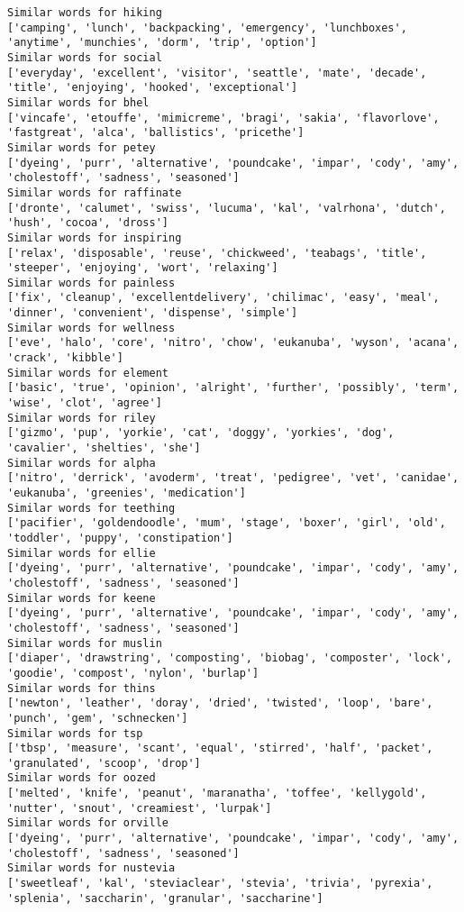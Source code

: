 \documentclass[11pt]{article}
\begin{document}
\begin{Verbatim}[commandchars=\\\{\}]
Similar words for hiking
['camping', 'lunch', 'backpacking', 'emergency', 'lunchboxes', 'anytime', 'munchies', 'dorm', 'trip', 'option']
Similar words for social
['everyday', 'excellent', 'visitor', 'seattle', 'mate', 'decade', 'title', 'enjoying', 'hooked', 'exceptional']
Similar words for bhel
['vincafe', 'etouffe', 'mimicreme', 'bragi', 'sakia', 'flavorlove', 'fastgreat', 'alca', 'ballistics', 'pricethe']
Similar words for petey
['dyeing', 'purr', 'alternative', 'poundcake', 'impar', 'cody', 'amy', 'cholestoff', 'sadness', 'seasoned']
Similar words for raffinate
['dronte', 'calumet', 'swiss', 'lucuma', 'kal', 'valrhona', 'dutch', 'hush', 'cocoa', 'dross']
Similar words for inspiring
['relax', 'disposable', 'reuse', 'chickweed', 'teabags', 'title', 'steeper', 'enjoying', 'wort', 'relaxing']
Similar words for painless
['fix', 'cleanup', 'excellentdelivery', 'chilimac', 'easy', 'meal', 'dinner', 'convenient', 'dispense', 'simple']
Similar words for wellness
['eve', 'halo', 'core', 'nitro', 'chow', 'eukanuba', 'wyson', 'acana', 'crack', 'kibble']
Similar words for element
['basic', 'true', 'opinion', 'alright', 'further', 'possibly', 'term', 'wise', 'clot', 'agree']
Similar words for riley
['gizmo', 'pup', 'yorkie', 'cat', 'doggy', 'yorkies', 'dog', 'cavalier', 'shelties', 'she']
Similar words for alpha
['nitro', 'derrick', 'avoderm', 'treat', 'pedigree', 'vet', 'canidae', 'eukanuba', 'greenies', 'medication']
Similar words for teething
['pacifier', 'goldendoodle', 'mum', 'stage', 'boxer', 'girl', 'old', 'toddler', 'puppy', 'constipation']
Similar words for ellie
['dyeing', 'purr', 'alternative', 'poundcake', 'impar', 'cody', 'amy', 'cholestoff', 'sadness', 'seasoned']
Similar words for keene
['dyeing', 'purr', 'alternative', 'poundcake', 'impar', 'cody', 'amy', 'cholestoff', 'sadness', 'seasoned']
Similar words for muslin
['diaper', 'drawstring', 'composting', 'biobag', 'composter', 'lock', 'goodie', 'compost', 'nylon', 'burlap']
Similar words for thins
['newton', 'leather', 'doray', 'dried', 'twisted', 'loop', 'bare', 'punch', 'gem', 'schnecken']
Similar words for tsp
['tbsp', 'measure', 'scant', 'equal', 'stirred', 'half', 'packet', 'granulated', 'scoop', 'drop']
Similar words for oozed
['melted', 'knife', 'peanut', 'maranatha', 'toffee', 'kellygold', 'nutter', 'snout', 'creamiest', 'lurpak']
Similar words for orville
['dyeing', 'purr', 'alternative', 'poundcake', 'impar', 'cody', 'amy', 'cholestoff', 'sadness', 'seasoned']
Similar words for nustevia
['sweetleaf', 'kal', 'steviaclear', 'stevia', 'trivia', 'pyrexia', 'splenia', 'saccharin', 'granular', 'saccharine']

\end{Verbatim}
\end{document}
